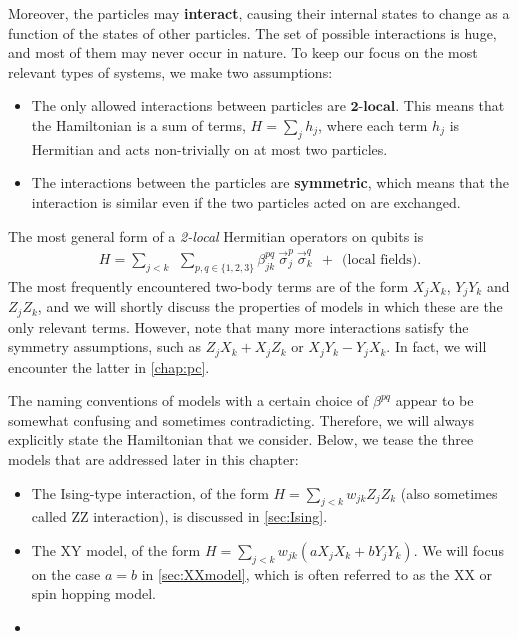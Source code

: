 Moreover, the particles may \textbf{interact}, causing their internal states to change as a function of the states of other particles. The set of possible interactions is huge, and most of them may never occur in nature. To keep our focus on the most relevant types of systems, we make two assumptions:
\begin{itemize}
\item The only allowed interactions between particles are $\mathbf{2\textbf{-local}}$. This means that the Hamiltonian is a sum of terms, $H = \sum_j h_j$, where each term $h_j$ is Hermitian and acts non-trivially on at most two particles. 
\item The interactions between the particles are \textbf{symmetric}, which means that the interaction is similar even if the two particles acted on are exchanged.
\end{itemize}
%
The most general form of a \emph{2-local} Hermitian operators on qubits is
\begin{align}
H = \sum_{j < k} \ \ \sum_{p, q \in \{1,2,3\} } \beta^{pq}_{jk} \  \vec{\sigma}^p_j \ \vec{\sigma}^q_k \ \ + \ \ \text{(local fields)}.
\label{eqn:2localham}
\end{align}
The most frequently encountered two-body terms are of the form $X_jX_k$, $Y_jY_k$ and $Z_jZ_k$, and we will shortly discuss the properties of models in which these are the only relevant terms. However, note that many more interactions satisfy the symmetry assumptions, such as $Z_j X_k + X_j Z_k$ or $X_j Y_k - Y_j X_k$. In fact, we will encounter the latter in \cref{chap:pc}. 

The naming conventions of models with a certain choice of $\beta^{pq}$ appear to be somewhat confusing and sometimes contradicting. Therefore, we will always explicitly state the Hamiltonian that we consider. Below, we tease the three models that are addressed later in this chapter: 
\begin{itemize}
\item The Ising-type interaction, of the form $H = \sum_{j<k} w_{jk} Z_j Z_k$ (also sometimes called ZZ interaction), is discussed in \cref{sec:Ising}.
\item The XY model, of the form $H = \sum_{j<k} w_{jk} \left( a  X_j X_k + b Y_j Y_k \right)$. We will focus on the case $a = b$ in \cref{sec:XXmodel}, which is often referred to as the XX or spin hopping model. 
\item {}
\end{itemize}
%


